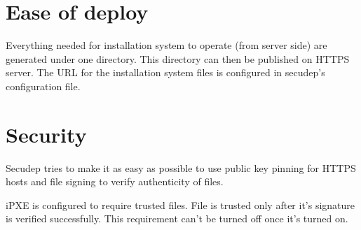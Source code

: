 \section{Ease of deploy}

Everything needed for installation system to operate (from server
side) are generated under one directory. This directory can then be
published on HTTPS server. The URL for the installation system files
is configured in secudep's configuration file.

\section{Security}

Secudep tries to make it as easy as possible to use public key pinning
for HTTPS hosts and file signing to verify authenticity of files.

iPXE is configured to require trusted files. File is trusted only
after it's signature is verified successfully. This requirement can't
be turned off once it's turned on.
